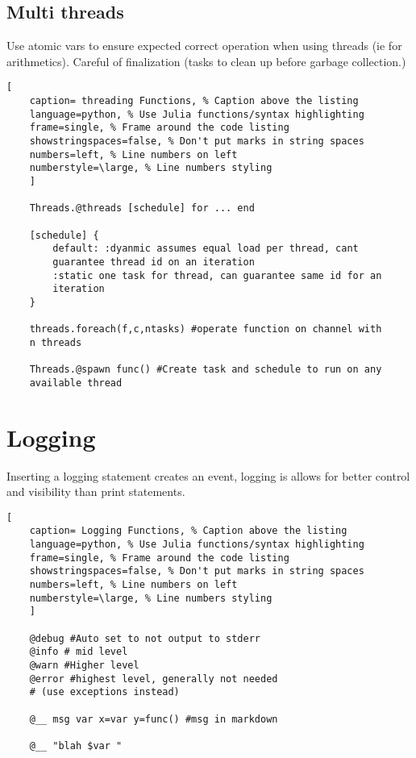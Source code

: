 \documentclass[11pt]{scrartcl} %
\begin{document}
\subsection{Multi threads}

Use atomic vars to ensure expected correct operation when using threads (ie for arithmetics). Careful of
finalization (tasks to clean up before garbage collection.)

\begin{lstlisting}[
	caption= threading Functions, % Caption above the listing
	language=python, % Use Julia functions/syntax highlighting
	frame=single, % Frame around the code listing
	showstringspaces=false, % Don't put marks in string spaces
	numbers=left, % Line numbers on left
	numberstyle=\large, % Line numbers styling
	]

	Threads.@threads [schedule] for ... end

	[schedule] {
		default: :dyanmic assumes equal load per thread, cant 
		guarantee thread id on an iteration
		:static one task for thread, can guarantee same id for an 
		iteration
	}

	threads.foreach(f,c,ntasks) #operate function on channel with 
	n threads

	Threads.@spawn func() #Create task and schedule to run on any 
	available thread

\end{lstlisting}

\section{Logging}

Inserting a logging statement creates an event, logging is allows for
better control and visibility than print statements.

\begin{lstlisting}[
	caption= Logging Functions, % Caption above the listing
	language=python, % Use Julia functions/syntax highlighting
	frame=single, % Frame around the code listing
	showstringspaces=false, % Don't put marks in string spaces
	numbers=left, % Line numbers on left
	numberstyle=\large, % Line numbers styling
	]

	@debug #Auto set to not output to stderr
	@info # mid level
	@warn #Higher level
	@error #highest level, generally not needed 
	# (use exceptions instead)

	@__ msg var x=var y=func() #msg in markdown

	@__ "blah $var "

\end{lstlisting}
\end{document}
